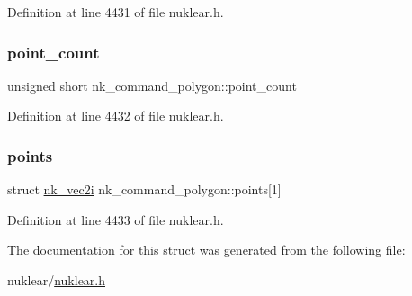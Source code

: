 Definition at line 4431 of file nuklear.\+h.

\mbox{\label{structnk__command__polygon_aae8b227a3aaec19baf32f06b28449728}} 
\subsubsection{\texorpdfstring{point\+\_\+count}{point\_count}}
{\footnotesize\ttfamily unsigned short nk\+\_\+command\+\_\+polygon\+::point\+\_\+count}



Definition at line 4432 of file nuklear.\+h.

\mbox{\label{structnk__command__polygon_ae28ff35fae64f9f3977d0402121db223}} 
\subsubsection{\texorpdfstring{points}{points}}
{\footnotesize\ttfamily struct \mbox{\hyperlink{structnk__vec2i}{nk\+\_\+vec2i}} nk\+\_\+command\+\_\+polygon\+::points\mbox{[}1\mbox{]}}



Definition at line 4433 of file nuklear.\+h.



The documentation for this struct was generated from the following file\+:\begin{DoxyCompactItemize}
\item 
nuklear/\mbox{\hyperlink{nuklear_8h}{nuklear.\+h}}\end{DoxyCompactItemize}
